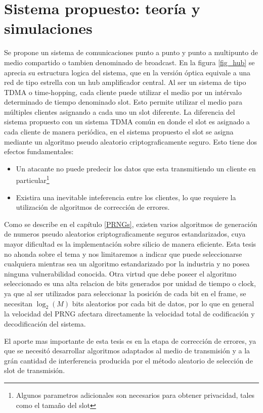 \chapter{Sistema propuesto: teoría y simulaciones}

Se propone un sistema de comunicaciones punto a punto y punto a multipunto de medio compartido o tambien denominado de broadcast. En la figura \ref{fig_hub} se aprecia su estructura logica del sistema, que en la versión óptica equivale a una red de tipo estrella con un hub amplificador central.
Al ser un sistema de tipo TDMA o time-hopping, cada cliente puede utilizar el medio por un intérvalo determinado de tiempo denominado slot. Esto permite utilizar el medio para múltiples clientes asignando a cada uno un slot diferente. La diferencia del sistema propuesto con un sistema TDMA común en donde el slot es asignado a cada cliente de manera periódica, en el sistema propuesto el slot se asigna mediante un algoritmo pseudo aleatorio criptograficamente seguro. Esto tiene dos efectos fundamentales: 

\begin{itemize}
 \item Un atacante no puede predecir los datos que esta transmitiendo un cliente en particular\footnote{Algunos parametros adicionales son necesarios para obtener privacidad, tales como el tamaño del slot}
 \item Existira una inevitable inteferencia entre los clientes, lo que requiere la utilización de algoritmos de corrección de errores.
\end{itemize}

Como se describe en el capítulo \ref{PRNGs}, existen varios algoritmos de generación de numeros pseudo aleatorios criptograficamente seguros estandarizados, cuya mayor dificultad es la implementación sobre silicio de manera eficiente. Esta tesis no ahonda sobre el tema y nos limitaremos a indicar que puede seleccionarse cualquiera mientras sea un algoritmo estandarizado por la industria y no posea ninguna vulnerabilidad conocida. Otra virtud que debe poseer el algoritmo seleccionado es una alta relacion de bits generados por unidad de tiempo o clock, ya que al ser utilizados para seleccionar la posición de cada bit en el frame, se necesitan $\log_2(M)$ bits aleatorios por cada bit de datos, por lo que en general la velocidad del PRNG afectara directamente la velocidad total de codificación y decodificación del sistema.

El aporte mas importante de esta tesis es en la etapa de corrección de errores, ya que se necesitó desarrollar algoritmos adaptados al medio de transmisión y a la grán cantidad de interferencia producida por el método aleatorio de selección de slot de transmisión.

